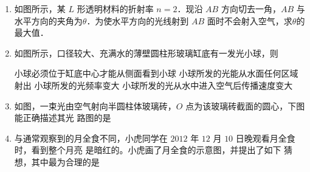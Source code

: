 

\begin{enumerate}
	\item
{}
如图所示，某 $ L $ 形透明材料的折射率 $ n=2 $．现沿 $ AB $ 方向切去一角，$ AB $ 与
水平方向的夹角为$ \theta $．为使水平方向的光线射到 $ AB $ 面时不会射入空气，求$ \theta $的最大值．
\begin{figure}[h!]
	\flushright
	
\end{figure}

\banswer{
	$ \theta=60 \degree $
}



\item 
{}
如图所示，口径较大、充满水的薄壁圆柱形玻璃缸底有一发光小球，则  
\begin{figure}[h!]
	\centering
	
\end{figure}


\fourchoices
{小球必须位于缸底中心才能从侧面看到小球}
{小球所发的光能从水面任何区域射出}
{小球所发的光频率变大}
{小球所发的光从水中进入空气后传播速度变大}



\item 
{}
如图，一束光由空气射向半圆柱体玻璃砖，$ O $ 点为该玻璃砖截面的圆心，下图能正确描述其光
路图的是  

\pfourchoices
{}
{}
{}
{}



\item 
{}
与通常观察到的月全食不同，小虎同学在 $ 2012 $ 年 $ 12 $ 月 $ 10 $ 日晚观看月全食时，看到整个月亮
是暗红的。小虎画了月全食的示意图，并提出了如下
猜想，其中最为合理的是  
\begin{figure}[h!]
	\centering
	
\end{figure}



\end{enumerate}

